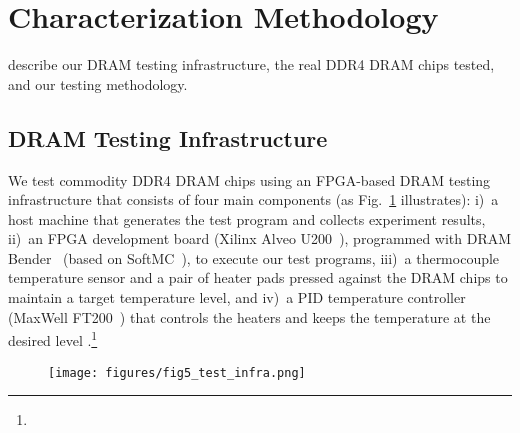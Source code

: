 \section{Characterization Methodology}
\label{sec:methodology}
 describe our DRAM testing infrastructure, the real DDR4 DRAM chips tested, and our testing methodology.

\subsection{DRAM Testing Infrastructure}
\label{subsec:methodology_infra}

We test {commodity} DDR4 DRAM chips using an FPGA-based DRAM testing infrastructure that consists of four main components {(as Fig.~\ref{fig:infrastructure} illustrates)}: i)~a host machine that generates the test {program} and {collects experiment results}, ii)~an FPGA development board (Xilinx Alveo U200~\cite{alveo_u200}), programmed with DRAM Bender~\cite{olgun2023drambender, safari-drambender} {(based on SoftMC~\cite{hassan2017softmc, softmcgithub})}, {to execute our test programs}, iii)~a thermocouple temperature sensor and a pair of heater pads pressed against the DRAM chips {to maintain a {target temperature level}}, and iv)~a PID temperature controller (MaxWell FT200~\cite{maxwellFT200}) that controls the heaters and keeps the temperature at the desired level .\footnote{}


\begin{figure}[ht]
\centering
\texttt{[image: figures/fig5\_test\_infra.png]}
\caption{}
\label{fig:infrastructure}
\end{figure}




